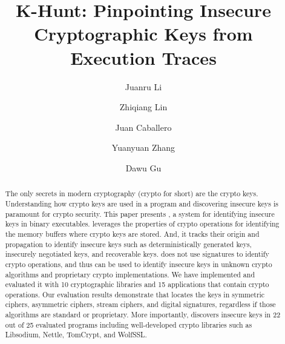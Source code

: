 \documentclass[sigconf]{acmart}
\begin{document}
\title{K-Hunt: Pinpointing Insecure Cryptographic Keys from Execution Traces}

\author{Juanru Li}

\author{Zhiqiang Lin}

\author{Juan Caballero}

\author{Yuanyuan Zhang}

\author{Dawu Gu}


\renewcommand{\shortauthors}{J. Li et al.}


\begin{abstract}
The only secrets in modern cryptography (crypto for short) are the crypto keys. Understanding how crypto keys are used in a program and discovering insecure keys is paramount for crypto security. 
This paper presents \sysname, a system for identifying insecure keys  in binary executables.
\sysname leverages the properties of crypto operations for identifying the memory buffers where crypto keys are stored. And, it tracks their origin and propagation to identify insecure keys such as deterministically generated keys, insecurely negotiated keys,  and recoverable keys.
\sysname does not use signatures to identify crypto operations,  and thus can be used to identify insecure keys in unknown crypto algorithms and proprietary crypto implementations.
We have implemented \sysname and evaluated it with 10 cryptographic libraries and 15 applications that contain crypto operations. Our evaluation results demonstrate that \sysname locates the keys in symmetric ciphers, asymmetric ciphers, stream ciphers, and digital signatures, regardless if those algorithms are standard or proprietary. More importantly, \sysname discovers insecure keys in 22 out of 25 evaluated programs including 
well-developed crypto libraries such as \textsf{\small Libsodium}, \textsf{\small Nettle}, \textsf{\small TomCrypt}, and \textsf{\small WolfSSL}.
\end{abstract}
\end{document}
